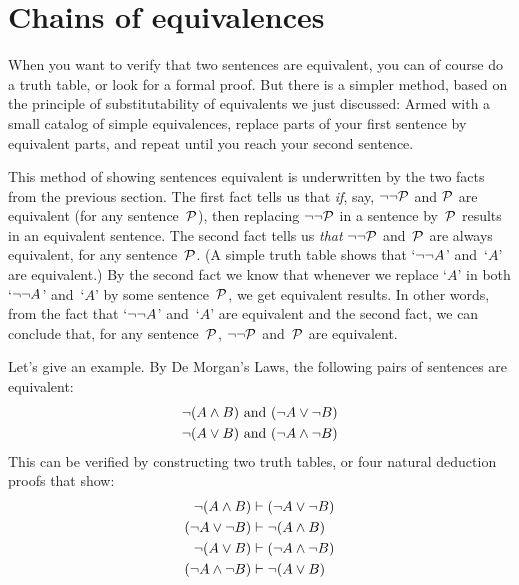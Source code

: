 \section{Chains of equivalences}

When you want to verify that two sentences are equivalent, you can of course do a truth table, or look for a formal proof.  But there is a simpler method, based on the principle of substitutability of equivalents we just discussed: Armed with a small catalog of simple equivalences, replace parts of your first sentence by equivalent parts, and repeat until you reach your second sentence.

This method of showing sentences equivalent is underwritten by the two facts from the previous section. The first fact tells us that \emph{if}, say, $\neg\neg \mathcal{P}$ and $\mathcal{P}$ are equivalent (for any sentence~$\mathcal{P}$), then replacing $\neg\neg\mathcal{P}$ in a sentence by~$\mathcal{P}$ results in an equivalent sentence. The second fact tells us \emph{that} $\neg\neg \mathcal{P}$ and~$\mathcal{P}$ are always equivalent, for any sentence~$\mathcal{P}$. (A simple truth table shows that `$\neg\neg A$' and~`$A$' are equivalent.) By the second fact we know that whenever we replace `$A$' in both `$\neg\neg A$' and~`$A$' by some sentence~$\mathcal{P}$, we get equivalent results. In other words, from the fact that `$\neg\neg A$' and~`$A$' are equivalent and the second fact, we can conclude that, for any sentence~$\mathcal{P}$, $\neg\neg \mathcal{P}$ and~$\mathcal{P}$ are equivalent.

Let's give an example. By De Morgan's Laws, the following pairs of sentences are equivalent:
\begin{align*}
	\neg (A \wedge B) & \text{ and } (\neg A \vee \neg B)\\
	\neg (A \vee B) & \text{ and } (\neg A \wedge \neg B)
\end{align*}
This can be verified by constructing two truth tables, or four natural deduction proofs that show:
\begin{align*}
	\neg (A \wedge B) & \vdash (\neg A \vee \neg B)\\
	(\neg A \vee \neg B) & \vdash \neg (A \wedge B)\\
	\neg (A \vee B) & \vdash (\neg A \wedge \neg B)\\
	(\neg A \wedge \neg B) & \vdash \neg (A \vee B)
\end{align*}

